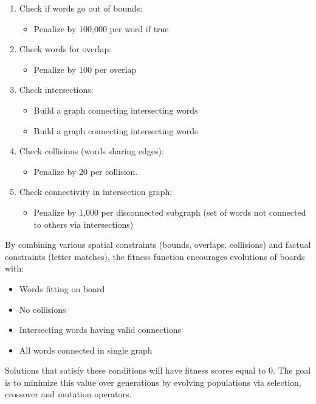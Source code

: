 \documentclass{article}
\begin{document}
\begin{enumerate}
		\item Check if words go out of bounds:
				\begin{itemize}
						\item Penalize by 100,000 per word if true
				\end{itemize}
		\item Check words for overlap:
				\begin{itemize}
						\item Penalize by 100 per overlap
				\end{itemize}
		\item Check intersections:
				\begin{itemize}
						\item Build a graph connecting intersecting words
						\item Build a graph connecting intersecting words
				\end{itemize}
		\item Check collisions (words sharing edges):
				\begin{itemize}
						\item Penalize by 20 per collision.
				\end{itemize}
		\item Check connectivity in intersection graph:
				\begin{itemize}
						\item Penalize by 1,000 per disconnected subgraph (set of words not connected to others via intersections)
				\end{itemize}
\end{enumerate}

By combining various spatial constraints (bounds, overlaps, collisions) and factual constraints (letter matches), the fitness function encourages evolutions of boards with:
\begin{itemize}
		\item Words fitting on board
		\item No collisions
		\item Intersecting words having valid connections
		\item All words connected in single graph
\end{itemize}

Solutions that satisfy these conditions will have fitness scores equal to 0. The goal is to minimize this value over generations by evolving populations via selection, crossover and mutation operators.
\end{document}
